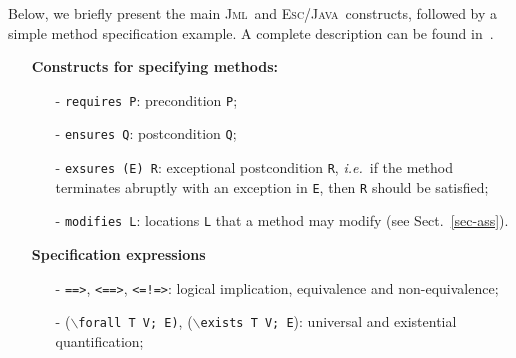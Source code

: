 \documentclass[a4paper]{llncs}
\newcommand{\jml}{\textsc{Jml}}
\newcommand{\escj}{\textsc{Esc/Java}}
\begin{document}
Below, we briefly present the main \jml\ and \escj\ constructs,
followed by a simple method specification example. A complete
description can be found in~\cite{LeavensBR00,LeinoNS00}.
\begin{itemize}
\item[] \textbf{Constructs for specifying methods:} 
\begin{itemize}
\item[-]{\texttt{requires P}: precondition {\tt P};}
 
\item[-]{\texttt{ensures Q}: postcondition {\tt Q};} 
 
\item[-]{\texttt{exsures (E) R}: exceptional postcondition \texttt{R},
\emph{i.e.}~if the method terminates abruptly with an exception in
\texttt{E}, then \texttt{R} should be satisfied; }

\item[-]{\texttt{modifies L}: locations \texttt{L} that
a method may modify (see Sect.~\ref{sec-ass}).}
 
\end{itemize}
 
\item[] \textbf{Specification expressions}  
 
\begin{itemize} 
\item[-]{\texttt{==>}, \texttt{<==>}, \texttt{<=!=>}}: logical
implication, equivalence and non-equivalence;
 
\item[-] {($\backslash$\texttt{forall T V; E)}, 
($\backslash$\texttt{exists T V; E})}: universal and existential
quantification;
 

\end{itemize}
\end{itemize}
\end{document}
